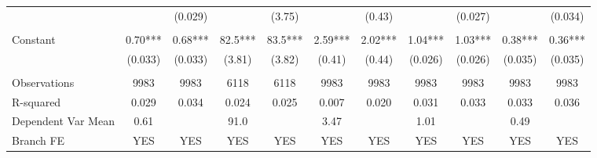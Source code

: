 \begin{tabular}{rrrrrrrrrrr}
      & \multicolumn{1}{c}{} & \multicolumn{1}{c}{\cellcolor[rgb]{ .816,  .808,  .808} (0.029)} & \multicolumn{1}{c}{} & \multicolumn{1}{c}{\cellcolor[rgb]{ .816,  .808,  .808} (3.75)} & \multicolumn{1}{c}{} & \multicolumn{1}{c}{\cellcolor[rgb]{ .816,  .808,  .808} (0.43)} & \multicolumn{1}{c}{} & \multicolumn{1}{c}{\cellcolor[rgb]{ .816,  .808,  .808} (0.027)} & \multicolumn{1}{c}{} & \multicolumn{1}{c}{\cellcolor[rgb]{ .816,  .808,  .808} (0.034)} \\
      &       &       &       &       &       &       &       &       &       &  \\
\multicolumn{1}{l}{Constant} & \multicolumn{1}{c}{0.70***} & \multicolumn{1}{c}{0.68***} & \multicolumn{1}{c}{82.5***} & \multicolumn{1}{c}{83.5***} & \multicolumn{1}{c}{2.59***} & \multicolumn{1}{c}{2.02***} & \multicolumn{1}{c}{1.04***} & \multicolumn{1}{c}{1.03***} & \multicolumn{1}{c}{0.38***} & \multicolumn{1}{c}{0.36***} \\
\multicolumn{1}{l}{} & \multicolumn{1}{c}{(0.033)} & \multicolumn{1}{c}{(0.033)} & \multicolumn{1}{c}{(3.81)} & \multicolumn{1}{c}{(3.82)} & \multicolumn{1}{c}{(0.41)} & \multicolumn{1}{c}{(0.44)} & \multicolumn{1}{c}{(0.026)} & \multicolumn{1}{c}{(0.026)} & \multicolumn{1}{c}{(0.035)} & \multicolumn{1}{c}{(0.035)} \\
      &       &       &       &       &       &       &       &       &       &  \\
\midrule
\multicolumn{1}{l}{Observations} & \multicolumn{1}{c}{9983} & \multicolumn{1}{c}{9983} & \multicolumn{1}{c}{6118} & \multicolumn{1}{c}{6118} & \multicolumn{1}{c}{9983} & \multicolumn{1}{c}{9983} & \multicolumn{1}{c}{9983} & \multicolumn{1}{c}{9983} & \multicolumn{1}{c}{9983} & \multicolumn{1}{c}{9983} \\
\multicolumn{1}{l}{R-squared} & \multicolumn{1}{c}{0.029} & \multicolumn{1}{c}{0.034} & \multicolumn{1}{c}{0.024} & \multicolumn{1}{c}{0.025} & \multicolumn{1}{c}{0.007} & \multicolumn{1}{c}{0.020} & \multicolumn{1}{c}{0.031} & \multicolumn{1}{c}{0.033} & \multicolumn{1}{c}{0.033} & \multicolumn{1}{c}{0.036} \\
\multicolumn{1}{l}{Dependent Var Mean} & \multicolumn{1}{c}{0.61} & \multicolumn{1}{c}{} & \multicolumn{1}{c}{91.0} & \multicolumn{1}{c}{} & \multicolumn{1}{c}{3.47} & \multicolumn{1}{c}{} & \multicolumn{1}{c}{1.01} & \multicolumn{1}{c}{} & \multicolumn{1}{c}{0.49} & \multicolumn{1}{c}{} \\
\multicolumn{1}{l}{Branch FE} & \multicolumn{1}{c}{YES} & \multicolumn{1}{c}{YES} & \multicolumn{1}{c}{YES} & \multicolumn{1}{c}{YES} & \multicolumn{1}{c}{YES} & \multicolumn{1}{c}{YES} & \multicolumn{1}{c}{YES} & \multicolumn{1}{c}{YES} & \multicolumn{1}{c}{YES} & \multicolumn{1}{c}{YES} \\

\end{tabular}
